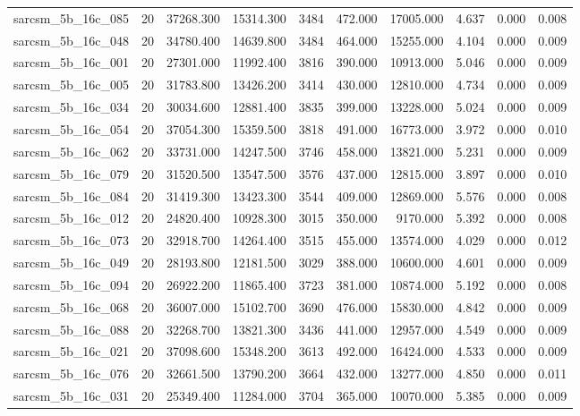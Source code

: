 \begin{tabular}{lrrrrrrrrr}
sarcsm\_5b\_16c\_085 & 20 & 37268.300 & 15314.300 & 3484 & 472.000 & 17005.000 & 4.637 & 0.000 & 0.008 \\
sarcsm\_5b\_16c\_048 & 20 & 34780.400 & 14639.800 & 3484 & 464.000 & 15255.000 & 4.104 & 0.000 & 0.009 \\
sarcsm\_5b\_16c\_001 & 20 & 27301.000 & 11992.400 & 3816 & 390.000 & 10913.000 & 5.046 & 0.000 & 0.009 \\
sarcsm\_5b\_16c\_005 & 20 & 31783.800 & 13426.200 & 3414 & 430.000 & 12810.000 & 4.734 & 0.000 & 0.009 \\
sarcsm\_5b\_16c\_034 & 20 & 30034.600 & 12881.400 & 3835 & 399.000 & 13228.000 & 5.024 & 0.000 & 0.009 \\
sarcsm\_5b\_16c\_054 & 20 & 37054.300 & 15359.500 & 3818 & 491.000 & 16773.000 & 3.972 & 0.000 & 0.010 \\
sarcsm\_5b\_16c\_062 & 20 & 33731.000 & 14247.500 & 3746 & 458.000 & 13821.000 & 5.231 & 0.000 & 0.009 \\
sarcsm\_5b\_16c\_079 & 20 & 31520.500 & 13547.500 & 3576 & 437.000 & 12815.000 & 3.897 & 0.000 & 0.010 \\
sarcsm\_5b\_16c\_084 & 20 & 31419.300 & 13423.300 & 3544 & 409.000 & 12869.000 & 5.576 & 0.000 & 0.008 \\
sarcsm\_5b\_16c\_012 & 20 & 24820.400 & 10928.300 & 3015 & 350.000 & 9170.000 & 5.392 & 0.000 & 0.008 \\
sarcsm\_5b\_16c\_073 & 20 & 32918.700 & 14264.400 & 3515 & 455.000 & 13574.000 & 4.029 & 0.000 & 0.012 \\
sarcsm\_5b\_16c\_049 & 20 & 28193.800 & 12181.500 & 3029 & 388.000 & 10600.000 & 4.601 & 0.000 & 0.009 \\
sarcsm\_5b\_16c\_094 & 20 & 26922.200 & 11865.400 & 3723 & 381.000 & 10874.000 & 5.192 & 0.000 & 0.008 \\
sarcsm\_5b\_16c\_068 & 20 & 36007.000 & 15102.700 & 3690 & 476.000 & 15830.000 & 4.842 & 0.000 & 0.009 \\
sarcsm\_5b\_16c\_088 & 20 & 32268.700 & 13821.300 & 3436 & 441.000 & 12957.000 & 4.549 & 0.000 & 0.009 \\
sarcsm\_5b\_16c\_021 & 20 & 37098.600 & 15348.200 & 3613 & 492.000 & 16424.000 & 4.533 & 0.000 & 0.009 \\
sarcsm\_5b\_16c\_076 & 20 & 32661.500 & 13790.200 & 3664 & 432.000 & 13277.000 & 4.850 & 0.000 & 0.011 \\
sarcsm\_5b\_16c\_031 & 20 & 25349.400 & 11284.000 & 3704 & 365.000 & 10070.000 & 5.385 & 0.000 & 0.009 \\

\end{tabular}
